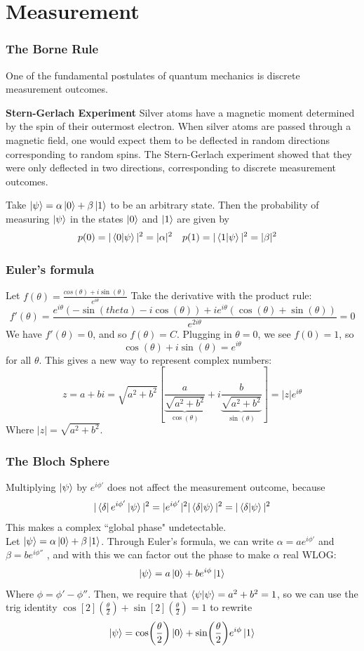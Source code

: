 \documentclass{beamer}
\begin{document}
\section{Measurement}
\begin{frame}
\frametitle{The Borne Rule}
One of the fundamental postulates of quantum mechanics is discrete measurement outcomes.
\begin{example}
\textbf{Stern-Gerlach Experiment} Silver atoms have a magnetic moment determined by the spin of their outermost electron. When silver atoms are passed through a magnetic field, one would expect them to be deflected in random directions corresponding to random spins. The Stern-Gerlach experiment showed that they were only deflected in two directions, corresponding to discrete measurement outcomes.
\end{example}
Take $\ket{\psi} = \alpha \ket 0 + \beta \ket 1$ to be an arbitrary state. Then the probability of measuring $\ket{\psi}$ in the states $\ket 0$ and $\ket 1$ are given by
\begin{align*}
p(0) &= |\braket{0}{\psi}|^2 = |\alpha|^2 & p(1) &= |\braket{1}{\psi}|^2 = |\beta|^2
\end{align*}
\end{frame}
\begin{frame}

\frametitle{Euler's formula}
Let $f(\theta) = \frac{cos(\theta)+i\sin(\theta)}{e^{i\theta}}$
Take the derivative with the product rule: 
$$
f'(\theta) = \frac{e^{i\theta}(-\sin(theta)-i\cos(\theta))+ie^{i\theta}(\cos(\theta)+\sin(\theta))}{e^{2i\theta}} = 0
$$
We have $f'(\theta) = 0$, and so $f(\theta) = C$. Plugging in $\theta = 0$, we see $f(0) = 1$, so
$$
\cos(\theta) + i\sin(\theta) = e^{i\theta}
$$
for all $\theta$. This gives a new way to represent complex numbers:
$$
z = a+bi = \sqrt{a^2+b^2}[\underbrace{\frac{a}{\sqrt{a^2+b^2}}}_{\cos(\theta)}+i\underbrace{\frac{b}{\sqrt{a^2+b^2}}}_{\sin(\theta)}] = |z|e^{i\theta}
$$
Where $|z| = \sqrt{a^2+b^2}$.
\end{frame}
\begin{frame}
\frametitle{The Bloch Sphere}
Multiplying $\ket \psi$ by $e^{i\phi'}$ does not affect the measurement outcome, because
$$
|\bra{\delta}e^{i\phi'}\ket{\psi}|^2 = |e^{i\phi'}|^2|\bra{\delta}\ket{\psi}|^2 = |\bra{\delta}\ket{\psi}|^2 
$$
This makes a complex ``global phase" undetectable. \\
\vspace{.5cm}
Let $\ket \psi = \alpha \ket 0 + \beta \ket 1$. Through Euler's formula, we can write
$
\alpha = ae^{i\phi'}
$
and
$
\beta = be^{i\phi''}
$
, and with this we can factor out the phase to make $\alpha$ real WLOG:
$$
\ket{\psi} = a\ket{0}+be^{i\phi}\ket 1
$$
Where $\phi = \phi'-\phi''$. Then, we require that $\braket{\psi}{\psi} = a^2+b^2 = 1$, so we can use the trig identity $\cos[2](\frac{\theta}{2}) + \sin[2](\frac{\theta}{2}) = 1$ to rewrite
$$
\ket{\psi} = \cos(\frac{\theta}{2})\ket{0}+\sin(\frac{\theta}{2})e^{i\phi}\ket{1}
$$
\end{frame}
\end{document}
